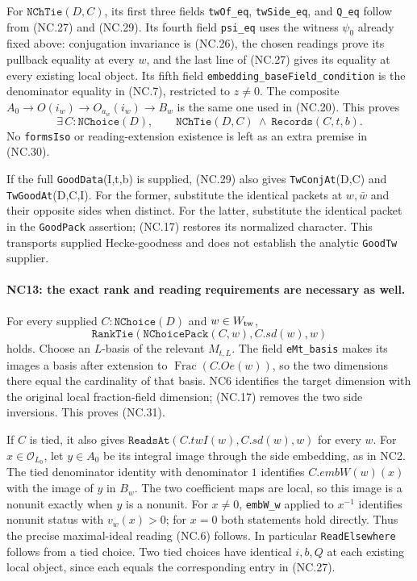 For \(\texttt{NChTie}(D,C)\), its first three fields
\texttt{twOf\_eq}, \texttt{twSide\_eq}, and \texttt{Q\_eq}
follow from (NC.27) and (NC.29).
Its fourth field \texttt{psi\_eq} uses the witness
\(\psi_0\) already fixed above: conjugation invariance is
(NC.26), the chosen readings prove its pullback equality
at every \(w\), and the last line of (NC.27) gives its equality
at every existing local object.
Its fifth field \texttt{embedding\_baseField\_condition}
is the denominator equality in (NC.7), restricted to \(z\ne0\).
The composite \(A_0\to O(i_w)\to O_{a_w}(i_w)\to B_w\)
is the same one used in (NC.20). This proves
\[
 \exists\, C:\texttt{NChoice}(D),\qquad
 \texttt{NChTie}(D,C)\ \wedge\ \texttt{Records}(C,t,b).
 \tag{NC.30}
\]
No \texttt{formsIso} or reading-extension existence is
left as an extra premise in (NC.30).

If the full \texttt{GoodData}(I,t,b) is supplied, (NC.29)
also gives \texttt{TwConjAt}(D,C) and
\texttt{TwGoodAt}(D,C,I). For the former, substitute the
identical packets at \(w,\bar w\) and their opposite sides
when distinct. For the latter, substitute the identical
packet in the \texttt{GoodPack} assertion; (NC.17) restores
its normalized character. This transports supplied
Hecke-goodness and does not establish the analytic
\texttt{GoodTw} supplier.

\paragraph{NC13: the exact rank and reading requirements are necessary as well.}
For every supplied \(C:\texttt{NChoice}(D)\) and
\(w\in W_{\rm tw}\),
\[
 \texttt{RankTie}(\texttt{NChoicePack}(C,w),C.sd(w),w)
 \tag{NC.31}
\]
holds. Choose an \(L\)-basis of the relevant \(M_{t,L}\).
The field \texttt{eMt\_basis} makes its images a basis after
extension to \(\operatorname{Frac}(C.Oe(w))\), so the two
dimensions there equal the cardinality of that basis.
NC6 identifies the target dimension with the original
local fraction-field dimension; (NC.17) removes the two
side inversions. This proves (NC.31).

If \(C\) is tied, it also gives
\(\texttt{ReadsAt}(C.twI(w),C.sd(w),w)\) for every \(w\).
For \(x\in\mathcal O_{L_0}\), let \(y\in A_0\) be its
integral image through the side embedding, as in NC2.
The tied denominator identity with denominator \(1\)
identifies \(C.embW(w)(x)\) with the image of \(y\) in \(B_w\).
The two coefficient maps are local, so this image is a
nonunit exactly when \(y\) is a nonunit.
For \(x\ne0\), \texttt{embW\_w} applied to \(x^{-1}\)
identifies nonunit status with \(v_w(x)>0\);
for \(x=0\) both statements hold directly.
Thus the precise maximal-ideal reading (NC.6) follows.
In particular \texttt{ReadElsewhere} follows from a tied
choice. Two tied choices have identical \(i,b,Q\) at each
existing local object, since each equals the corresponding
entry in (NC.27).

